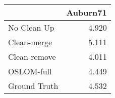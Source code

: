 \begin{tabular}{lr}
\toprule
{} & Auburn71 \\
\midrule
No Clean Up  &    4.920 \\
Clean-merge  &    5.111 \\
Clean-remove &    4.011 \\
OSLOM-full   &    4.449 \\
Ground Truth &    4.532 \\
\bottomrule
\end{tabular}
